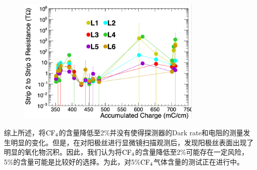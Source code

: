 \begin{figure}[!htbp]
    \centering
    \includegraphics[width=0.8\textwidth]{figures/chapter05/s2s_ME11.png}
    \label{fig:c05f20}
\end{figure}

综上所述，将$\mathrm{CF_4}$的含量降低至2\%并没有使得探测器的Dark rate和电阻的测量发生明显的变化。但是，在对阳极丝进行显微镜扫描观测后，发现阳极丝表面出现了明显的氧化物沉积。因此，我们认为将$\mathrm{CF_4}$的含量降低至2\%可能存在一定风险，5\%的含量可能是比较好的选择。为此，对5\%$\mathrm{CF_4}$气体含量的测试正在进行中。